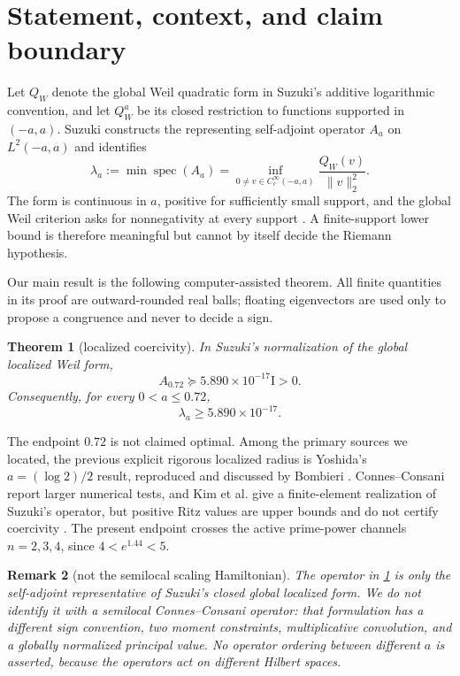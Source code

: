 \documentclass[10pt]{article}
\newtheorem{theorem}{Theorem}[section]
\newtheorem{remark}[theorem]{Remark}
\newcommand{\spec}{\operatorname{spec}}
\newcommand{\Id}{\mathrm I}
\begin{document}
\section{Statement, context, and claim boundary}

Let $Q_W$ denote the global Weil quadratic form in Suzuki's additive
logarithmic convention, and let $Q_W^a$ be its closed restriction to functions
supported in $(-a,a)$.  Suzuki constructs the representing self-adjoint
operator $A_a$ on $L^2(-a,a)$ and identifies
\begin{equation}\label{eq:lambda-def}
 \lambda_a:=\min\spec(A_a)=
 \inf_{0\ne v\in C_c^\infty(-a,a)}
 \frac{Q_W(v)}{\|v\|_2^2}.
\end{equation}
The form is continuous in $a$, positive for sufficiently small support, and
the global Weil criterion asks for nonnegativity at every support
\cite{Suzuki2026,Yoshida1992,Bombieri2000}.  A finite-support lower bound is
therefore meaningful but cannot by itself decide the Riemann hypothesis.

Our main result is the following computer-assisted theorem.  All finite
quantities in its proof are outward-rounded real balls; floating eigenvectors
are used only to propose a congruence and never to decide a sign.

\begin{theorem}[localized coercivity]\label{thm:main}
In Suzuki's normalization of the global localized Weil form,
\begin{equation}\label{eq:main}
 \boxed{A_{0.72}\succeq
 5.890\times10^{-17}\Id>0.}
\end{equation}
Consequently, for every $0<a\le0.72$,
\begin{equation}\label{eq:interval}
 \lambda_a\ge5.890\times10^{-17}.
\end{equation}
\end{theorem}

The endpoint $0.72$ is not claimed optimal.  Among the primary sources we
located, the previous explicit rigorous localized radius is Yoshida's
$a=(\log2)/2$ result, reproduced and discussed by Bombieri
\cite{Yoshida1992,Bombieri2000}.  Connes--Consani report larger numerical
tests, and Kim et al. give a finite-element realization of Suzuki's operator,
but positive Ritz values are upper bounds and do not certify coercivity
\cite{ConnesConsani2023,KimEtAl2026}.  The present endpoint crosses the active
prime-power channels $n=2,3,4$, since $4<e^{1.44}<5$.

\begin{remark}[not the semilocal scaling Hamiltonian]
The operator in \cref{thm:main} is only the self-adjoint representative of
Suzuki's closed global localized form.  We do not identify it with a semilocal
Connes--Consani operator: that formulation has a different sign convention,
two moment constraints, multiplicative convolution, and a globally normalized
principal value.  No operator ordering between different $a$ is asserted,
because the operators act on different Hilbert spaces.
\end{remark}
\end{document}
